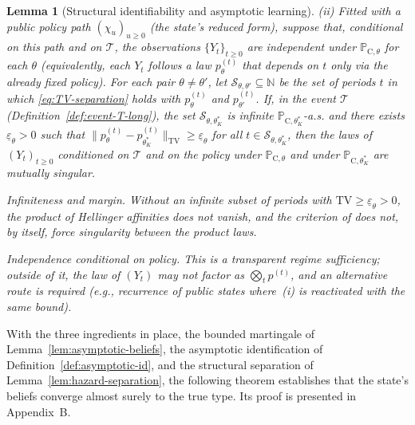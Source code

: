 \documentclass[review,authoryear,12pt]{elsarticle}
\theoremstyle{plain}
\newtheorem{lemma}[theorem]{Lemma}
\theoremstyle{definition}
\newcommand{\ProbC}[1]{\mathbb{P}_{\mathrm{C},#1}}
\newcommand{\1}{\mathbf{1}}
\begin{document}
\begin{lemma}[Structural identifiability and asymptotic learning]
\medskip
\noindent\textup{(ii)}
Fitted with a public policy path $(\chi_u)_{u\ge 0}$ \textup{(}the state's reduced form\textup{)}, suppose that, conditional on this path and on $\mathcal{T}$, the observations $\{Y_t\}_{t\ge 0}$ are independent under $\ProbC{\theta}$ for each $\theta$ \textup{(}equivalently, each $Y_t$ follows a law $p_\theta^{(t)}$ that depends on $t$ only via the already fixed policy\textup{)}. For each pair $\theta\neq\theta'$, let $\mathcal{S}_{\theta,\theta'}\subseteq\mathbb{N}$ be the set of periods $t$ in which \eqref{eq:TV-separation} holds with $p_\theta^{(t)}$ and $p_{\theta'}^{(t)}$. If, in the event $\mathcal{T}$ \textup{(}Definition~\ref{def:event-T-long}\textup{)}, the set $\mathcal{S}_{\theta,\theta_K^\ast}$ is infinite $\ProbC{\theta_K^\ast}$-a.s. and there exists $\underline{\varepsilon}_{\theta}>0$ such that $\|p_\theta^{(t)}-p_{\theta_K^\ast}^{(t)}\|_{\mathrm{TV}}\ge \underline{\varepsilon}_{\theta}$ for all $t\in\mathcal{S}_{\theta,\theta_K^\ast}$, then the laws of $(Y_t)_{t\ge 0}$ conditioned on $\mathcal{T}$ and on the policy under $\ProbC{\theta}$ and under $\ProbC{\theta_K^\ast}$ are mutually singular.

\medskip
\begin{list}{}{%
  \setlength{\leftmargin}{2.25em}%
  \setlength{\labelwidth}{2.25em}%
  \setlength{\labelsep}{0.45em}%
  \setlength{\itemsep}{0.35em}%
  \setlength{\parsep}{0pt}%
  \setlength{\topsep}{0.25em}%
}
\item[\textup{(C3)}] \textup{Infiniteness and margin.}\quad
Without an infinite subset of periods with $\mathrm{TV}\ge\underline{\varepsilon}_\theta>0$, the product of Hellinger affinities does not vanish, and the criterion of \citet{Kakutani1948} does not, by itself, force singularity between the product laws.
\item[\textup{(C4)}] \textup{Independence conditional on policy.}\quad
This is a transparent regime sufficiency; outside of it, the law of $(Y_t)$ may not factor as $\bigotimes_t p^{(t)}$, and an alternative route is required \textup{(}e.g., recurrence of public states where~\textup{(i)} is reactivated with the same bound\textup{)}.
\end{list}
\end{lemma}

With the three ingredients in place, the bounded martingale of Lemma~\ref{lem:asymptotic-beliefs}, the asymptotic identification of Definition~\ref{def:asymptotic-id}, and the structural separation of Lemma~\ref{lem:hazard-separation}, the following theorem establishes that the state's beliefs converge almost surely to the true type. Its proof is presented in Appendix~B.
\end{document}
